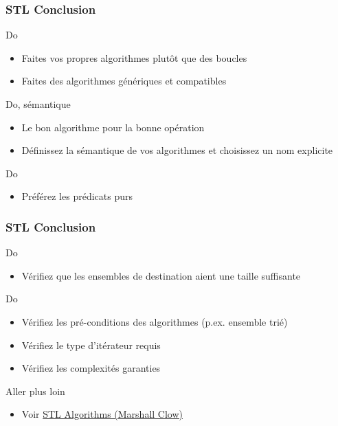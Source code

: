 \documentclass[C++.tex]{subfiles}
\begin{document}
\begin{frame}[fragile]
	\frametitle{STL Conclusion}
	\begin{exampleblock}{Do}
		\begin{itemize}
			\item Faites vos propres algorithmes plutôt que des boucles
			\item Faites des algorithmes génériques et compatibles
		\end{itemize}
	\end{exampleblock}

	\begin{exampleblock}{Do, sémantique}
		\begin{itemize}
			\item Le bon algorithme pour la bonne opération
			\item Définissez la sémantique de vos algorithmes et choisissez un nom explicite
		\end{itemize}
	\end{exampleblock}

	\begin{exampleblock}{Do}
		\begin{itemize}
			\item Préférez les prédicats purs
		\end{itemize}
	\end{exampleblock}
\end{frame}

\begin{frame}[fragile]
	\frametitle{STL Conclusion}
	\begin{exampleblock}{Do}
		\begin{itemize}
			\item Vérifiez que les ensembles de destination aient une taille suffisante
		\end{itemize}
	\end{exampleblock}

	\begin{exampleblock}{Do}
		\begin{itemize}
			\item Vérifiez les pré-conditions des algorithmes (p.ex. ensemble trié)
			\item Vérifiez le type d'itérateur requis
			\item Vérifiez les complexités garanties
		\end{itemize}
	\end{exampleblock}

	\begin{block}{Aller plus loin}
		\begin{itemize}
			\item Voir \href{https://github.com/CppCon/CppCon2016/blob/master/Presentations/STL\%20Algorithms/STL\%20Algorithms\%20-\%20Marshall\%20Clow\%20-\%20CppCon\%202016.pdf}{STL Algorithms (Marshall Clow)}
		\end{itemize}

	\end{block}
\end{frame}
\end{document}
